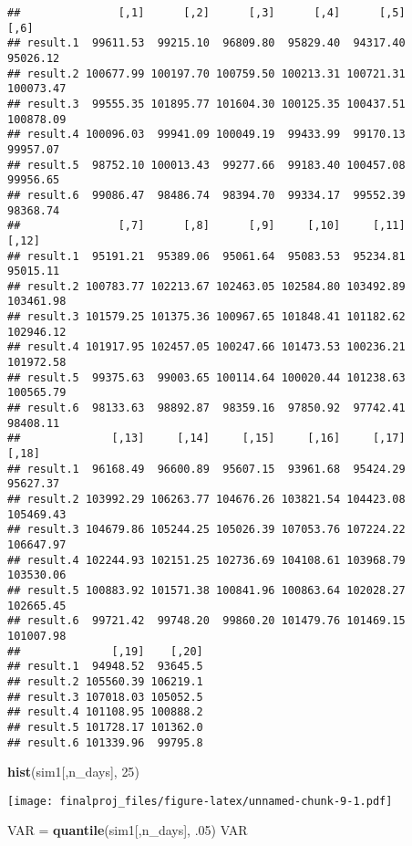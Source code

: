 \documentclass[]{article}
\newenvironment{Shaded}{\begin{snugshade}}{\end{snugshade}}
\newcommand{\DecValTok}[1]{\textcolor[rgb]{0.00,0.00,0.81}{#1}}
\newcommand{\FloatTok}[1]{\textcolor[rgb]{0.00,0.00,0.81}{#1}}
\newcommand{\KeywordTok}[1]{\textcolor[rgb]{0.13,0.29,0.53}{\textbf{#1}}}
\newcommand{\NormalTok}[1]{#1}
\newcommand{\StringTok}[1]{\textcolor[rgb]{0.31,0.60,0.02}{#1}}
\begin{document}
\begin{verbatim}
##               [,1]      [,2]      [,3]      [,4]      [,5]      [,6]
## result.1  99611.53  99215.10  96809.80  95829.40  94317.40  95026.12
## result.2 100677.99 100197.70 100759.50 100213.31 100721.31 100073.47
## result.3  99555.35 101895.77 101604.30 100125.35 100437.51 100878.09
## result.4 100096.03  99941.09 100049.19  99433.99  99170.13  99957.07
## result.5  98752.10 100013.43  99277.66  99183.40 100457.08  99956.65
## result.6  99086.47  98486.74  98394.70  99334.17  99552.39  98368.74
##               [,7]      [,8]      [,9]     [,10]     [,11]     [,12]
## result.1  95191.21  95389.06  95061.64  95083.53  95234.81  95015.11
## result.2 100783.77 102213.67 102463.05 102584.80 103492.89 103461.98
## result.3 101579.25 101375.36 100967.65 101848.41 101182.62 102946.12
## result.4 101917.95 102457.05 100247.66 101473.53 100236.21 101972.58
## result.5  99375.63  99003.65 100114.64 100020.44 101238.63 100565.79
## result.6  98133.63  98892.87  98359.16  97850.92  97742.41  98408.11
##              [,13]     [,14]     [,15]     [,16]     [,17]     [,18]
## result.1  96168.49  96600.89  95607.15  93961.68  95424.29  95627.37
## result.2 103992.29 106263.77 104676.26 103821.54 104423.08 105469.43
## result.3 104679.86 105244.25 105026.39 107053.76 107224.22 106647.97
## result.4 102244.93 102151.25 102736.69 104108.61 103968.79 103530.06
## result.5 100883.92 101571.38 100841.96 100863.64 102028.27 102665.45
## result.6  99721.42  99748.20  99860.20 101479.76 101469.15 101007.98
##              [,19]    [,20]
## result.1  94948.52  93645.5
## result.2 105560.39 106219.1
## result.3 107018.03 105052.5
## result.4 101108.95 100888.2
## result.5 101728.17 101362.0
## result.6 101339.96  99795.8
\end{verbatim}

\begin{Shaded}
\begin{Highlighting}[]
\KeywordTok{hist}\NormalTok{(sim1[,n_days], }\DecValTok{25}\NormalTok{)}
\end{Highlighting}
\end{Shaded}

\texttt{[image: finalproj\_files/figure-latex/unnamed-chunk-9-1.pdf]}

\begin{Shaded}
\begin{Highlighting}[]
\NormalTok{VAR =}\StringTok{ }\KeywordTok{quantile}\NormalTok{(sim1[,n_days], }\FloatTok{.05}\NormalTok{)}
\NormalTok{VAR}
\end{Highlighting}
\end{Shaded}
\end{document}
